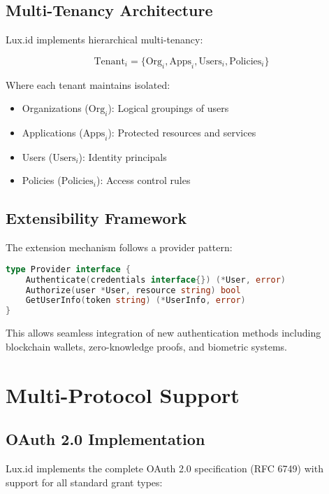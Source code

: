 \documentclass[11pt,a4paper]{article}
\begin{document}
\subsection{Multi-Tenancy Architecture}

Lux.id implements hierarchical multi-tenancy:

\begin{equation}
    \text{Tenant}_i = \{\text{Org}_i, \text{Apps}_i, \text{Users}_i, \text{Policies}_i\}
\end{equation}

Where each tenant maintains isolated:
\begin{itemize}
    \item Organizations ($\text{Org}_i$): Logical groupings of users
    \item Applications ($\text{Apps}_i$): Protected resources and services
    \item Users ($\text{Users}_i$): Identity principals
    \item Policies ($\text{Policies}_i$): Access control rules
\end{itemize}

\subsection{Extensibility Framework}

The extension mechanism follows a provider pattern:

\begin{lstlisting}[language=Go]
type Provider interface {
    Authenticate(credentials interface{}) (*User, error)
    Authorize(user *User, resource string) bool
    GetUserInfo(token string) (*UserInfo, error)
}
\end{lstlisting}

This allows seamless integration of new authentication methods including blockchain wallets, zero-knowledge proofs, and biometric systems.

\section{Multi-Protocol Support}

\subsection{OAuth 2.0 Implementation}

Lux.id implements the complete OAuth 2.0 specification (RFC 6749) with support for all standard grant types:
\end{document}
